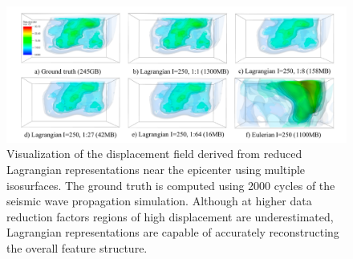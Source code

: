 \begin{figure}[!t]
\centering
\includegraphics[width=\linewidth, trim={1cm, 0cm, 0.9cm, 0cm}, clip]{Images/sw4_figure_small.pdf}
\vspace{-2mm}
\caption{Visualization of the displacement field derived from reduced Lagrangian representations near the epicenter using multiple isosurfaces. The ground truth is computed using 2000 cycles of the seismic wave propagation simulation. Although at higher data reduction factors regions of high displacement are underestimated, Lagrangian representations are capable of accurately reconstructing the overall feature structure.} 
\vspace{-5mm}
\label{fig:sw4_figure}
\end{figure}
